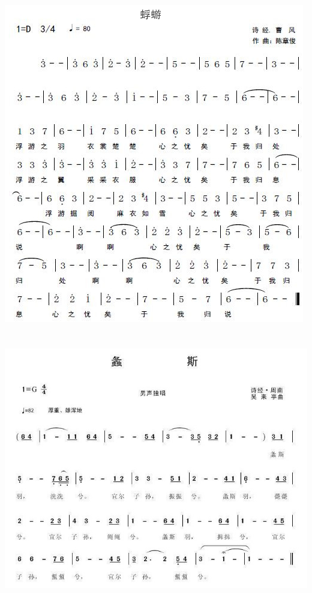 \documentclass[cn,pad,twocol]{elegantbook}
\begin{document}
\section{}      \includegraphics[width=\textwidth]{rpi400/20210123-蜉蝣.png}
\section{}      \includegraphics[width=\textwidth]{rpi400/20210123-螽斯.jpg}
\end{document}
